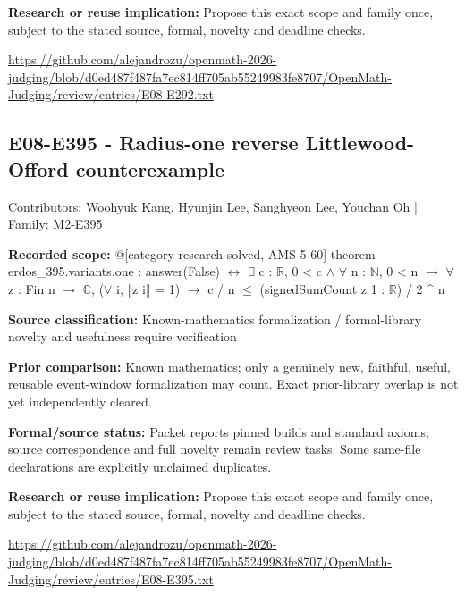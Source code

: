 \documentclass[11pt,a4paper]{article}
\begin{document}
\textbf{Research or reuse implication:} Propose this exact scope and family once, subject to the stated source, formal, novelty and deadline checks.

{\small \url{https://github.com/alejandrozu/openmath-2026-judging/blob/d0ed487f487fa7ec814ff705ab55249983fe8707/OpenMath-Judging/review/entries/E08-E292.txt}\par}

\begin{samepage}
\subsection{E08-E395  -  Radius-one reverse Littlewood-Offord counterexample}
{\small Contributors: Woohyuk Kang, Hyunjin Lee, Sanghyeon Lee, Youchan Oh | Family: M2-E395\par}

\textbf{Recorded scope:} @[category research solved, AMS 5 60] theorem erdos\_395.variants.one : answer(False) \ensuremath{\leftrightarrow} \ensuremath{\exists} c : \ensuremath{\mathbb{R}}, 0 < c \ensuremath{\wedge} \ensuremath{\forall} n : \ensuremath{\mathbb{N}}, 0 < n \ensuremath{\to} \ensuremath{\forall} z : Fin n \ensuremath{\to} \ensuremath{\mathbb{C}}, (\ensuremath{\forall} i, ‖z i‖ = 1) \ensuremath{\to} c / n \ensuremath{\leq} (signedSumCount z 1 : \ensuremath{\mathbb{R}}) / 2 \textasciicircum{} n


\end{samepage}
\textbf{Source classification:} Known-mathematics formalization / formal-library novelty and usefulness require verification

\textbf{Prior comparison:} Known mathematics; only a genuinely new, faithful, useful, reusable event-window formalization may count. Exact prior-library overlap is not yet independently cleared.

\textbf{Formal/source status:} Packet reports pinned builds and standard axioms; source correspondence and full novelty remain review tasks. Some same-file declarations are explicitly unclaimed duplicates.

\textbf{Research or reuse implication:} Propose this exact scope and family once, subject to the stated source, formal, novelty and deadline checks.

{\small \url{https://github.com/alejandrozu/openmath-2026-judging/blob/d0ed487f487fa7ec814ff705ab55249983fe8707/OpenMath-Judging/review/entries/E08-E395.txt}\par}
\end{document}
